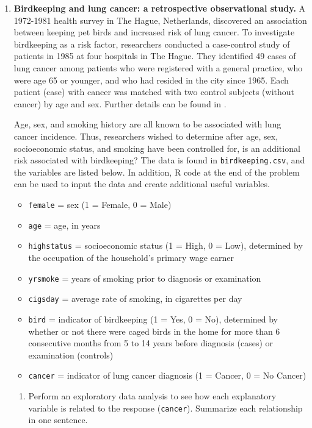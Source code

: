 \documentclass[
]{krantz}
\providecommand{\tightlist}{%
  \setlength{\itemsep}{0pt}\setlength{\parskip}{0pt}}
\begin{document}
\begin{enumerate}
\def\labelenumi{\arabic{enumi}.}
\setcounter{enumi}{3}
\item
  \textbf{Birdkeeping and lung cancer: a retrospective observational study.} A 1972-1981 health survey in The Hague, Netherlands, discovered an association between keeping pet birds and increased risk of lung cancer. To investigate birdkeeping as a risk factor, researchers conducted a case-control study of patients in 1985 at four hospitals in The Hague. They identified 49 cases of lung cancer among patients who were registered with a general practice, who were age 65 or younger, and who had resided in the city since 1965. Each patient (case) with cancer was matched with two control subjects (without cancer) by age and sex. Further details can be found in \citet{Holst1988}.

  Age, sex, and smoking history are all known to be associated with lung cancer incidence. Thus, researchers wished to determine after age, sex, socioeconomic status, and smoking have been controlled for, is an additional risk associated with birdkeeping? The data \citep{Ramsey2002} is found in \texttt{birdkeeping.csv}, and the variables are listed below. In addition, R code at the end of the problem can be used to input the data and create additional useful variables.

  \begin{itemize}
  \tightlist
  \item
    \texttt{female} = sex (1 = Female, 0 = Male)
  \item
    \texttt{age} = age, in years
  \item
    \texttt{highstatus} = socioeconomic status (1 = High, 0 = Low), determined by the occupation of the household's primary wage earner
  \item
    \texttt{yrsmoke} = years of smoking prior to diagnosis or examination
  \item
    \texttt{cigsday} = average rate of smoking, in cigarettes per day
  \item
    \texttt{bird} = indicator of birdkeeping (1 = Yes, 0 = No), determined by whether or not there were caged birds in the home for more than 6 consecutive months from 5 to 14 years before diagnosis (cases) or examination (controls)
  \item
    \texttt{cancer} = indicator of lung cancer diagnosis (1 = Cancer, 0 = No Cancer)
  \end{itemize}

  \begin{enumerate}
  \def\labelenumii{\alph{enumii}.}
  \tightlist
  \item
    Perform an exploratory data analysis to see how each explanatory variable is related to the response (\texttt{cancer}). Summarize each relationship in one sentence.
  \end{enumerate}


\end{enumerate}
\end{document}
